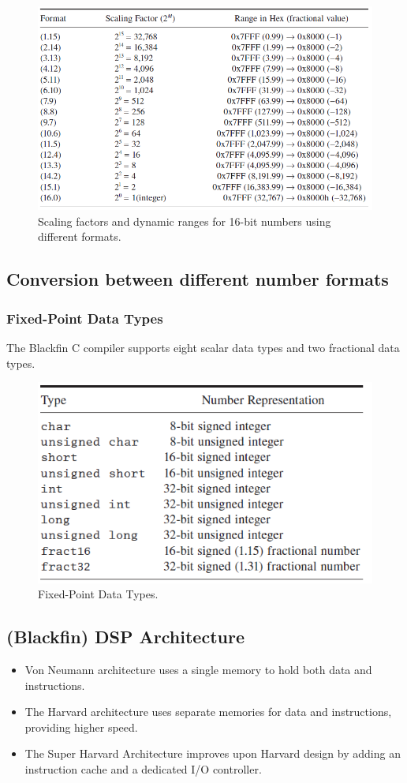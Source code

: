 \begin{figure} [H]
	\centering
	\includegraphics[width=\linewidth]{graphics/8.png}
	\caption{Scaling factors and dynamic ranges for 16-bit numbers using different formats.}
	\label{fig:8}
\end{figure}

\subsection{Conversion between different number formats}
\subsubsection{Fixed-Point Data Types}
The Blackfin C compiler supports eight scalar data types and two fractional data types.

\begin{figure} [H]
	\centering
	\includegraphics[width=0.8\linewidth]{graphics/3.png}
	\caption{Fixed-Point Data Types.}
	\label{fig:3}
\end{figure}

\subsection{(Blackfin) DSP Architecture}
\begin{itemize}
	\item Von Neumann architecture uses a single memory to hold both data and instructions.
	\item The Harvard architecture uses separate memories 
	for data and instructions, providing higher speed.
	\item The Super Harvard Architecture improves upon Harvard design by adding an instruction cache and a dedicated I/O controller.
\end{itemize}

